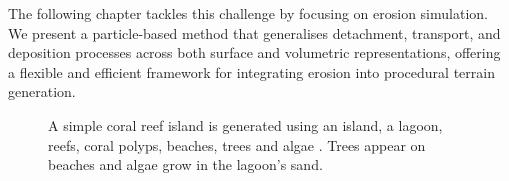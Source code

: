 The following chapter tackles this challenge by focusing on erosion simulation. We present a particle-based method that generalises detachment, transport, and deposition processes across both surface and volumetric representations, offering a flexible and efficient framework for integrating erosion into procedural terrain generation.

\begin{figure}[H]
    \caption{A simple coral reef island is generated using an island, a lagoon, reefs, coral polyps, beaches, trees and algae . Trees appear on beaches and algae grow in the lagoon's sand.}
    \label{fig:env-obj-coral-island-scene}
\end{figure}










































